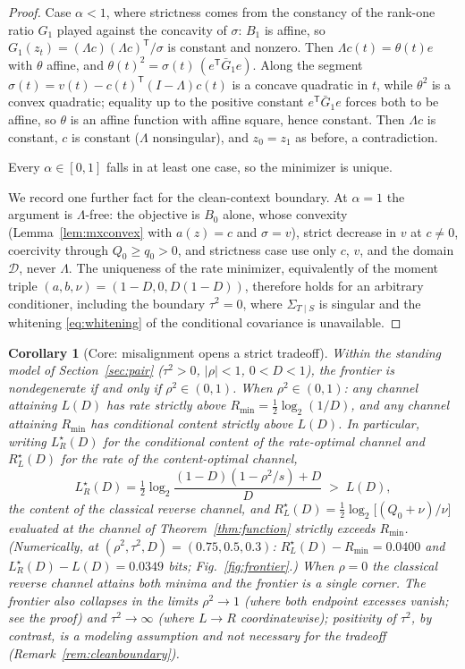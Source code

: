 ﻿\documentclass[11pt,onecolumn]{IEEEtran}
\newtheorem{corollary}[theorem]{Corollary}
\newcommand{\LRs}{L_{R}^{\star}}
\newcommand{\RLs}{R_{L}^{\star}}
\begin{document}
\begin{proof}
Case $\alpha<1$, where strictness comes from the constancy of the
rank-one ratio $G_1$ played against the concavity of $\sigma$: $B_1$
is affine, so
$G_1(z_t)=(\Lambda c)(\Lambda c)^{\mathsf T}/\sigma$ is constant and
nonzero. Then $\Lambda c(t)=\theta(t)e$ with $\theta$ affine, and
$\theta(t)^2=\sigma(t)\,(e^{\mathsf T}\bar G_1e)$. Along the segment
$\sigma(t)=v(t)-c(t)^{\mathsf T}(I-\Lambda)c(t)$ is a concave
quadratic in $t$, while $\theta^2$ is a convex quadratic; equality up
to the positive constant $e^{\mathsf T}\bar G_1e$ forces both to be
affine, so $\theta$ is an affine function with affine square, hence
constant. Then $\Lambda c$ is constant, $c$ is constant ($\Lambda$
nonsingular), and $z_0=z_1$ as before, a contradiction.

Every $\alpha\in[0,1]$ falls in at least one case, so the minimizer is
unique.

We record one further fact for the clean-context boundary. At
$\alpha=1$ the argument is $\Lambda$-free: the objective is $B_0$
alone, whose convexity (Lemma~\ref{lem:mxconvex} with $a(z)=c$ and
$\sigma=v$), strict decrease in $v$ at $c\ne0$, coercivity through
$Q_0\ge q_0>0$, and strictness case use only $c$, $v$, and the domain
$\mathcal D$, never $\Lambda$. The uniqueness of the rate minimizer,
equivalently of the moment triple $(a,b,\nu)=(1-D,0,D(1-D))$, therefore
holds for an arbitrary conditioner, including the boundary $\tau^2=0$,
where $\Sigma_{T\mid S}$ is singular and the whitening
\eqref{eq:whitening} of the conditional covariance is unavailable.
\end{proof}

\begin{corollary}[Core: misalignment opens a strict tradeoff]
\label{cor:misalign}
Within the standing model of Section~\ref{sec:pair} ($\tau^2>0$,
$|\rho|<1$, $0<D<1$), the frontier is nondegenerate if and only if
$\rho^2\in(0,1)$. When $\rho^2\in(0,1)$: any channel attaining $L(D)$
has rate strictly above $R_{\min}=\tfrac12\log_2(1/D)$, and any
channel attaining $R_{\min}$ has conditional content strictly above
$L(D)$. In particular, writing $\LRs(D)$ for the conditional content of
the rate-optimal channel and $\RLs(D)$ for the rate of the
content-optimal channel,
\[
\LRs(D)=\tfrac12\log_2\frac{(1-D)(1-\rho^2/s)+D}{D}\;>\;L(D),
\]
the content of the classical reverse channel, and
$\RLs(D)=\tfrac12\log_2\bigl[(Q_0+\nu)/\nu\bigr]$ evaluated at the channel of
Theorem~\ref{thm:function} strictly exceeds $R_{\min}$. (Numerically,
at $(\rho^2,\tau^2,D)=(0.75,0.5,0.3)$: $\RLs(D)-R_{\min}=0.0400$ and
$\LRs(D)-L(D)=0.0349$ bits; Fig.~\ref{fig:frontier}.) When $\rho=0$ the classical reverse channel
attains both minima and the frontier is a single corner. The frontier
also collapses in the limits $\rho^2\to1$ (where both endpoint
excesses vanish; see the proof) and $\tau^2\to\infty$ (where
$L\to R$ coordinatewise); positivity of $\tau^2$, by contrast, is a
modeling assumption and not necessary for the tradeoff
(Remark~\ref{rem:cleanboundary}).
\end{corollary}
\end{document}
